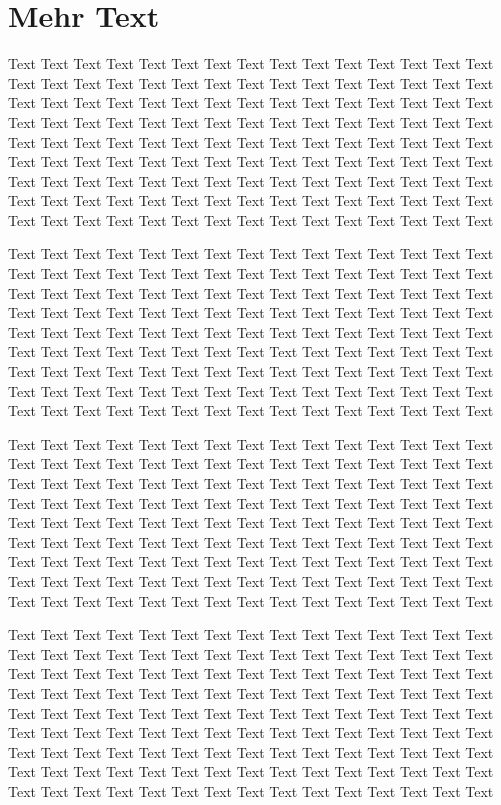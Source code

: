 \section{Mehr Text}

Text Text Text Text Text Text Text Text Text Text Text Text Text Text Text 
Text Text Text Text Text Text Text Text Text Text Text Text Text Text Text 
Text Text Text Text Text Text Text Text Text Text Text Text Text Text Text 
Text Text Text Text Text Text Text Text Text Text Text Text Text Text Text 
Text Text Text Text Text Text Text Text Text Text Text Text Text Text Text 
Text Text Text Text Text Text Text Text Text Text Text Text Text Text Text 
Text Text Text Text Text Text Text Text Text Text Text Text Text Text Text 
Text Text Text Text Text Text Text Text Text Text Text Text Text Text Text 
Text Text Text Text Text Text Text Text Text Text Text Text Text Text Text 

Text Text Text Text Text Text Text Text Text Text Text Text Text Text Text 
Text Text Text Text Text Text Text Text Text Text Text Text Text Text Text 
Text Text Text Text Text Text Text Text Text Text Text Text Text Text Text 
Text Text Text Text Text Text Text Text Text Text Text Text Text Text Text 
Text Text Text Text Text Text Text Text Text Text Text Text Text Text Text 
Text Text Text Text Text Text Text Text Text Text Text Text Text Text Text 
Text Text Text Text Text Text Text Text Text Text Text Text Text Text Text 
Text Text Text Text Text Text Text Text Text Text Text Text Text Text Text 
Text Text Text Text Text Text Text Text Text Text Text Text Text Text Text 

Text Text Text Text Text Text Text Text Text Text Text Text Text Text Text 
Text Text Text Text Text Text Text Text Text Text Text Text Text Text Text 
Text Text Text Text Text Text Text Text Text Text Text Text Text Text Text 
Text Text Text Text Text Text Text Text Text Text Text Text Text Text Text 
Text Text Text Text Text Text Text Text Text Text Text Text Text Text Text 
Text Text Text Text Text Text Text Text Text Text Text Text Text Text Text 
Text Text Text Text Text Text Text Text Text Text Text Text Text Text Text 
Text Text Text Text Text Text Text Text Text Text Text Text Text Text Text 
Text Text Text Text Text Text Text Text Text Text Text Text Text Text Text 

Text Text Text Text Text Text Text Text Text Text Text Text Text Text Text 
Text Text Text Text Text Text Text Text Text Text Text Text Text Text Text 
Text Text Text Text Text Text Text Text Text Text Text Text Text Text Text 
Text Text Text Text Text Text Text Text Text Text Text Text Text Text Text 
Text Text Text Text Text Text Text Text Text Text Text Text Text Text Text 
Text Text Text Text Text Text Text Text Text Text Text Text Text Text Text 
Text Text Text Text Text Text Text Text Text Text Text Text Text Text Text 
Text Text Text Text Text Text Text Text Text Text Text Text Text Text Text 
Text Text Text Text Text Text Text Text Text Text Text Text Text Text Text 

